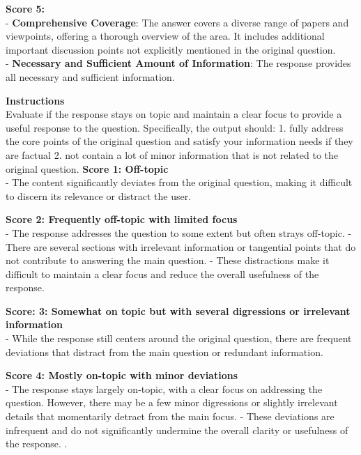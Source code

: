 \begin{table}[h!]
\begin{tcolorbox}[colback=blue!5!white,colframe=blue!75!black]
{\bf Score 5: }\\
- {\bf Comprehensive Coverage}: The answer covers a diverse range of papers and viewpoints, offering a thorough overview of the area. It includes additional important discussion points not explicitly mentioned in the original question.\\
- {\bf Necessary and Sufficient Amount of Information}: The response provides all necessary and sufficient information. 
\end{tcolorbox}
\caption{\label{tab:rubrics_coverage} {\bf Evaluation rubrics for coverage.} The evaluation instructions and five-point rubric for assessing coverage.}
\end{table}

\begin{table}[h!]
\begin{tcolorbox}[colback=blue!5!white,colframe=blue!75!black]
{\bf Instructions}\\ 
Evaluate if the response stays on topic and maintain a clear focus to provide a useful response to the question. Specifically, the output should: 1. fully address the core points of the original question and satisfy your information needs if they are factual 2. not contain a lot of minor information that is not related to the original question. 
\tcblower
{\bf Score 1: Off-topic}\\
- The content significantly deviates from the original question, making it difficult to discern its relevance or distract the user. 

{\bf Score 2: Frequently off-topic with limited focus}\\
- The response addresses the question to some extent but often strays off-topic. 
- There are several sections with irrelevant information or tangential points that do not contribute to answering the main question. 
- These distractions make it difficult to maintain a clear focus and reduce the overall usefulness of the response.


{\bf Score: 3: Somewhat on topic but with several digressions or irrelevant information}\\
- While the response still centers around the original question, there are frequent deviations that distract from the main question or redundant information.

{\bf Score 4: Mostly on-topic with minor deviations}\\
- The response stays largely on-topic, with a clear focus on addressing the question. However, there may be a few minor digressions or slightly irrelevant details that momentarily detract from the main focus.
- These deviations are infrequent and do not significantly undermine the overall clarity or usefulness of the response.
.


\end{tcolorbox}
\end{table}
